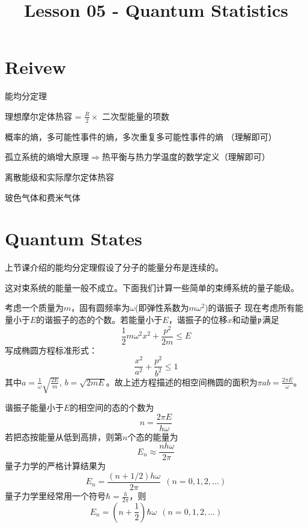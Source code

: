 \documentclass[CJK]{beamer}
\title{Lesson 05 - Quantum Statistics}
\author{}
\date{}
\begin{document}

\section{Reivew}

\begin{frame}
\bch
\bitem
\item{能均分定理}
\item{理想摩尔定体热容 = $\frac{R}{2}\times$ 二次型能量的项数}
\item{概率的熵，多可能性事件的熵，多次重复多可能性事件的熵 （理解即可）}
\item{孤立系统的熵增大原理$\Rightarrow$热平衡与热力学温度的数学定义（理解即可）}
\eitem
\ech
\end{frame}


\begin{frame}
\bch
\bitem
\item{离散能级和实际摩尔定体热容}
\item{玻色气体和费米气体}
\eitem
\ech
\end{frame}

\section{Quantum States}

\begin{frame}
\bch
上节课介绍的能均分定理假设了分子的能量分布是连续的。

\skipline

这对束系统的能量一般不成立。下面我们计算一些简单的束缚系统的量子能级。



\ech
\end{frame}

\begin{frame}
\bch
{\small 
考虑一个质量为$m$，固有圆频率为$\omega$(即弹性系数为$m\omega^2$)的谐振子
现在考虑所有能量小于$E$的谐振子的态的个数。若能量小于$E$，谐振子的位移$x$和动量${\mathfrak{p}}$满足
$$\frac{1}{2}m \omega^2 x^2 + \frac{p^2}{2m} \le E $$
写成椭圆方程标准形式：
$$\frac{x^2} {a^2} + \frac{p^2}{b^2} \le 1 $$
其中$a = \frac{1}{\omega}\sqrt{\frac{2E}{m}}$, $b = \sqrt{2mE}$。故上述方程描述的相空间椭圆的面积为$ \pi a b = \frac{2\pi E}{\omega}$。
}
\ech
\end{frame}


\begin{frame}
\bch
{\small 
谐振子能量小于$E$的相空间的态的个数为
$$n = \frac{2\pi E}{ h \omega}$$
若把态按能量从低到高排，则第$n$个态的能量为
$$ E_n \approx \frac{ n h\omega}{2\pi}$$
量子力学的严格计算结果为
$$ E_n = \frac{ (n+1/2) h\omega}{2\pi}\ \ (n = 0,1,2,\ldots)$$
量子力学里经常用一个符号$\hbar = \frac{h}{2\pi}$，则
$$ E_n = \left(n + \frac{1}{2}\right) \hbar\omega\ \ (n = 0,1,2,\ldots)$$

}
\ech
\end{frame}
\end{document}
